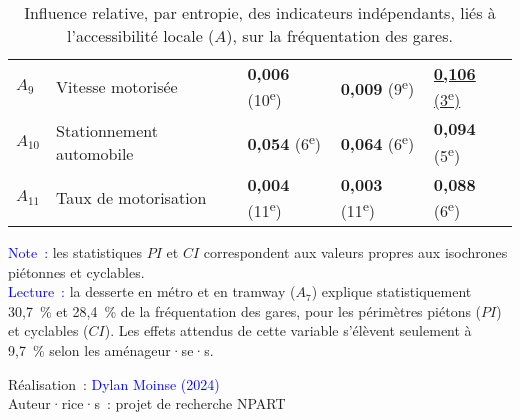 \begin{table}[h!]
{\begin{tabular}{p{}p{}p{}p{}p{}}
\small{\(A_{9}\)} & \small{Vitesse motorisée} & \small{\textbf{0,006} (10\textsuperscript{e})} & \small{\textbf{0,009} (9\textsuperscript{e})} & \underline{\small{\textbf{0,106}} (3\textsuperscript{e})}\\
\small{\(A_{10}\)} & \small{Stationnement automobile} & \small{\textbf{0,054} (6\textsuperscript{e})} & \small{\textbf{0,064} (6\textsuperscript{e})} & \small{\textbf{0,094} (5\textsuperscript{e})}\\
\small{\(A_{11}\)} & \small{Taux de motorisation} & \small{\textbf{0,004} (11\textsuperscript{e})} & \small{\textbf{0,003} (11\textsuperscript{e})} & \small{\textbf{0,088} (6\textsuperscript{e})}\\
        \hline
        \end{tabular}}
    \caption{Influence relative, par entropie, des indicateurs indépendants, liés à l'accessibilité locale (\(A\)), sur la fréquentation des gares.}
    \label{table-chap6:influence-indicateurs-accessibility}
        \vspace{5pt}
        \begin{flushleft}\scriptsize{
        \textcolor{blue}{Note~:} les statistiques \(PI\) et \(CI\) correspondent aux valeurs propres aux isochrones piétonnes et cyclables.
        \\
        \textcolor{blue}{Lecture~:} la desserte en métro et en tramway (\(A_{7}\)) explique statistiquement 30,7~\% et 28,4~\% de la fréquentation des gares, pour les périmètres piétons (\(PI\)) et cyclables (\(CI\)). Les effets attendus de cette variable s'élèvent seulement à 9,7~\% selon les aménageur·se·s.
        }\end{flushleft}
        \begin{flushright}\scriptsize{
        Réalisation~: \textcolor{blue}{Dylan Moinse (2024)}
        \\
        Auteur·rice·s~: projet de recherche \acrshort{NPART}
        }\end{flushright}
        \end{table}